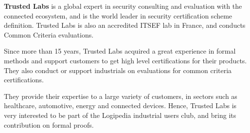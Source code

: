 {\bf Trusted Labs} is a global expert in security consulting and
evaluation with the connected ecosystem, and is the world leader in
security certification scheme definition. Trusted Labs is also an
accredited ITSEF lab in France, and conducts Common Criteria
evaluations.

Since more than 15 years, Trusted Labs acquired a great experience in
formal methods and support customers to get high level certifications
for their products. They also conduct or support industrials on
evaluations for common criteria certifications.

They provide their expertise to a large variety of customers, in
sectors such as healthcare, automotive, energy and connected
devices. Hence, Trusted Labs is very interested to be part of the
Logipedia industrial users club, and bring its contribution on formal
proofs.



